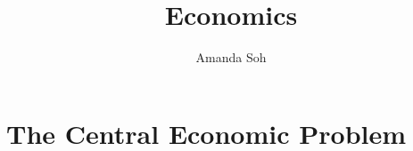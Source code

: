 




    \begin{Huge}
            \centering
                \title{\textbf{\textsf{Economics}}}
                \author{Amanda Soh}
    \end{Huge}
    \maketitle
\newpage


\newpage
\tableofcontents

\newpage
\part{The Central Economic Problem}








